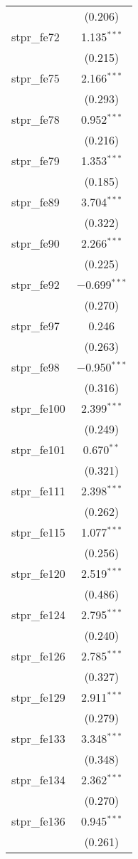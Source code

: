\begin{table}[!htbp]
\begin{tabular}{@{\extracolsep{5pt}}lc}
  & (0.206) \\ 
  stpr\_fe72 & 1.135$^{***}$ \\ 
  & (0.215) \\ 
  stpr\_fe75 & 2.166$^{***}$ \\ 
  & (0.293) \\ 
  stpr\_fe78 & 0.952$^{***}$ \\ 
  & (0.216) \\ 
  stpr\_fe79 & 1.353$^{***}$ \\ 
  & (0.185) \\ 
  stpr\_fe89 & 3.704$^{***}$ \\ 
  & (0.322) \\ 
  stpr\_fe90 & 2.266$^{***}$ \\ 
  & (0.225) \\ 
  stpr\_fe92 & $-$0.699$^{***}$ \\ 
  & (0.270) \\ 
  stpr\_fe97 & 0.246 \\ 
  & (0.263) \\ 
  stpr\_fe98 & $-$0.950$^{***}$ \\ 
  & (0.316) \\ 
  stpr\_fe100 & 2.399$^{***}$ \\ 
  & (0.249) \\ 
  stpr\_fe101 & 0.670$^{**}$ \\ 
  & (0.321) \\ 
  stpr\_fe111 & 2.398$^{***}$ \\ 
  & (0.262) \\ 
  stpr\_fe115 & 1.077$^{***}$ \\ 
  & (0.256) \\ 
  stpr\_fe120 & 2.519$^{***}$ \\ 
  & (0.486) \\ 
  stpr\_fe124 & 2.795$^{***}$ \\ 
  & (0.240) \\ 
  stpr\_fe126 & 2.785$^{***}$ \\ 
  & (0.327) \\ 
  stpr\_fe129 & 2.911$^{***}$ \\ 
  & (0.279) \\ 
  stpr\_fe133 & 3.348$^{***}$ \\ 
  & (0.348) \\ 
  stpr\_fe134 & 2.362$^{***}$ \\ 
  & (0.270) \\ 
  stpr\_fe136 & 0.945$^{***}$ \\ 
  & (0.261) \\ 

\end{tabular}
\end{table}

